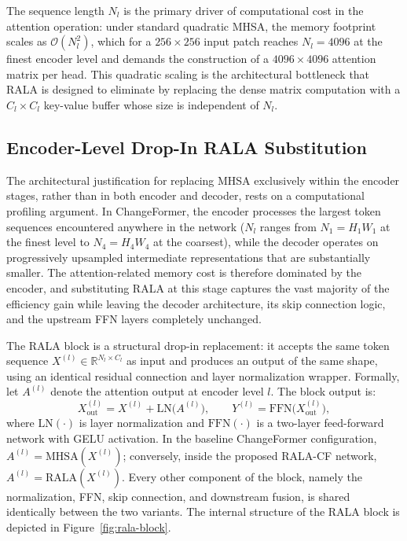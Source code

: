 The sequence length $N_l$ is the primary driver of computational cost in the attention operation: under standard quadratic \ac{MHSA}, the memory footprint scales as $\mathcal{O}(N_l^2)$, which for a $256 \times 256$ input patch reaches $N_l = 4096$ at the finest encoder level and demands the construction of a $4096 \times 4096$ attention matrix per head. This quadratic scaling is the architectural bottleneck that \ac{RALA} is designed to eliminate by replacing the dense matrix computation with a $C_l \times C_l$ key-value buffer whose size is independent of $N_l$.

\subsection{Encoder-Level Drop-In RALA Substitution}
\label{subsec:rala-substitution}

The architectural justification for replacing \ac{MHSA} exclusively within the encoder stages, rather than in both encoder and decoder, rests on a computational profiling argument. In ChangeFormer, the encoder processes the largest token sequences encountered anywhere in the network ($N_l$ ranges from $N_1 = H_1 W_1$ at the finest level to $N_4 = H_4 W_4$ at the coarsest), while the decoder operates on progressively upsampled intermediate representations that are substantially smaller. The attention-related memory cost is therefore dominated by the encoder, and substituting \ac{RALA} at this stage captures the vast majority of the efficiency gain while leaving the decoder architecture, its skip connection logic, and the upstream \ac{FFN} layers completely unchanged.

The \ac{RALA} block is a structural drop-in replacement: it accepts the same token sequence $X^{(l)} \in \mathbb{R}^{N_l \times C_l}$ as input and produces an output of the same shape, using an identical residual connection and layer normalization wrapper. Formally, let $A^{(l)}$ denote the attention output at encoder level $l$. The block output is:
\begin{equation}
X_{\mathrm{out}}^{(l)} = X^{(l)} + \mathrm{LN}\bigl(A^{(l)}\bigr),
\qquad
Y^{(l)} = \mathrm{FFN}\!\bigl(X_{\mathrm{out}}^{(l)}\bigr),
\label{eq:residual_ffn}
\end{equation}
where $\mathrm{LN}(\cdot)$ is layer normalization and $\mathrm{FFN}(\cdot)$ is a two-layer feed-forward network with GELU activation. In the baseline ChangeFormer configuration, $A^{(l)} = \mathrm{MHSA}(X^{(l)})$; conversely, inside the proposed \ac{RALA-CF} network, $A^{(l)} = \mathrm{RALA}(X^{(l)})$. Every other component of the block, namely the normalization, \ac{FFN}, skip connection, and downstream fusion, is shared identically between the two variants. The internal structure of the \ac{RALA} block is depicted in Figure~\ref{fig:rala-block}.

